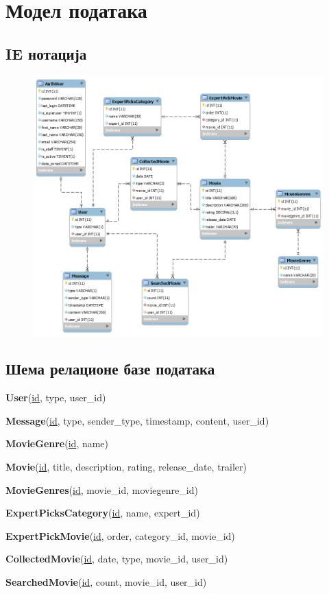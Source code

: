 \newpage
\section{Модел података}

\subsection{IE нотација}

\begin{figure}[h]
  \includegraphics[width=\linewidth]{model.png}
\end{figure}

\subsection{Шема релационе базе података}

\textbf{User}(\underline{id}, type, user\_id)
\vspace{0.2cm}

\textbf{Message}(\underline{id}, type, sender\_type, timestamp, content, user\_id)
\vspace{0.2cm}

\textbf{MovieGenre}(\underline{id}, name)
\vspace{0.2cm}

\textbf{Movie}(\underline{id}, title, description, rating, release\_date, trailer)
\vspace{0.2cm}

\textbf{MovieGenres}(\underline{id}, movie\_id, moviegenre\_id)
\vspace{0.2cm}

\textbf{ExpertPicksCategory}(\underline{id}, name, expert\_id)
\vspace{0.2cm}

\textbf{ExpertPickMovie}(\underline{id}, order, category\_id, movie\_id)
\vspace{0.2cm}

\textbf{CollectedMovie}(\underline{id}, date, type, movie\_id, user\_id)
\vspace{0.2cm}

\textbf{SearchedMovie}(\underline{id}, count, movie\_id, user\_id)
